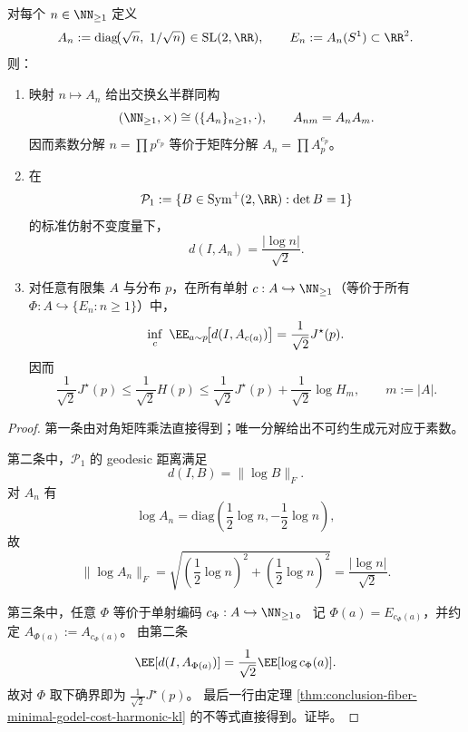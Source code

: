 \begin{theorem}\label{thm:conclusion-unit-circle-ellipse-prime-register-isomorphism}
对每个 \(n\in\NN_{\ge 1}\) 定义
\[
A_n:=\mathrm{diag}\!\bigl(\sqrt n,\ 1/\sqrt n\bigr)\in \mathrm{SL}(2,\RR),
\qquad
E_n:=A_n(S^1)\subset\RR^2.
\]
则：
\begin{enumerate}
  \item 映射 \(n\mapsto A_n\) 给出交换幺半群同构
  \[
  (\NN_{\ge 1},\times)\cong (\{A_n\}_{n\ge 1},\cdot),\qquad A_{nm}=A_nA_m.
  \]
  因而素数分解 \(n=\prod p^{e_p}\) 等价于矩阵分解 \(A_n=\prod A_p^{e_p}\)。
  \item 在
  \[
  \mathcal P_1:=\{B\in\mathrm{Sym}^+(2,\RR):\det B=1\}
  \]
  的标准仿射不变度量下，
  \[
  d(I,A_n)=\frac{|\log n|}{\sqrt2}.
  \]
  \item 对任意有限集 \(A\) 与分布 \(p\)，在所有单射
  \(c:A\hookrightarrow\NN_{\ge 1}\)（等价于所有 \(\Phi:A\hookrightarrow\{E_n:n\ge 1\}\)）中，
  \[
  \inf_c\ \EE_{a\sim p}\!\bigl[d(I,A_{c(a)})\bigr]
  =\frac{1}{\sqrt2}J^\star(p).
  \]
  因而
  \[
  \frac{1}{\sqrt2}J^\star(p)
  \le \frac{1}{\sqrt2}H(p)
  \le \frac{1}{\sqrt2}J^\star(p)+\frac{1}{\sqrt2}\log H_m,\qquad m:=|A|.
  \]
\end{enumerate}
\end{theorem}
\begin{proof}
第一条由对角矩阵乘法直接得到；唯一分解给出不可约生成元对应于素数。

第二条中，\(\mathcal P_1\) 的 geodesic 距离满足
\[
d(I,B)=\|\log B\|_F.
\]
对 \(A_n\) 有
\[
\log A_n=\mathrm{diag}\!\left(\frac12\log n,-\frac12\log n\right),
\]
故
\[
\|\log A_n\|_F
=\sqrt{\left(\frac12\log n\right)^2+\left(\frac12\log n\right)^2}
=\frac{|\log n|}{\sqrt2}.
\]

第三条中，任意 \(\Phi\) 等价于单射编码 \(c_\Phi:A\hookrightarrow\NN_{\ge 1}\)。
记 \(\Phi(a)=E_{c_\Phi(a)}\)，并约定 \(A_{\Phi(a)}:=A_{c_\Phi(a)}\)。
由第二条
\[
\EE[d(I,A_{\Phi(a)})]
=\frac{1}{\sqrt2}\EE[\log c_\Phi(a)].
\]
故对 \(\Phi\) 取下确界即为 \(\frac{1}{\sqrt2}J^\star(p)\)。
最后一行由定理 \ref{thm:conclusion-fiber-minimal-godel-cost-harmonic-kl} 的不等式直接得到。证毕。
\end{proof}



